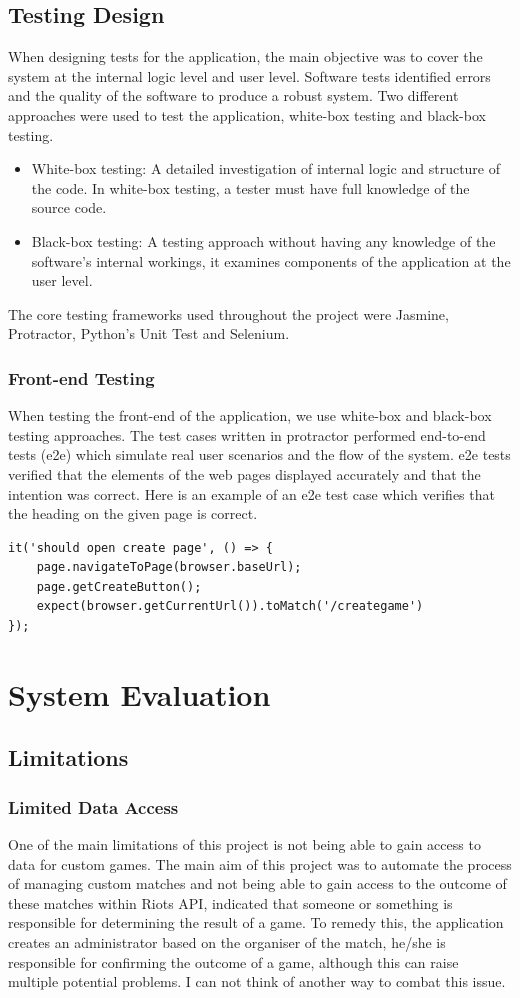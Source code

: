 \section{Testing Design}
When designing tests for the application, the main objective was to cover the system at the internal logic level and user level. Software tests identified errors and the quality of the software \cite{nidhra2012black} to produce a robust system. Two different approaches were used to test the application, white-box testing and black-box testing. 
\begin{itemize}
	\item White-box testing: A detailed investigation of internal logic and structure of the code. In white-box testing, a tester must have full knowledge of the source code.
	\item Black-box testing: A testing approach without having any knowledge of the software's internal workings, it examines components of the application at the user level.
\end{itemize}

The core testing frameworks used throughout the project were Jasmine, Protractor, Python's Unit Test and Selenium. 
\subsection{Front-end Testing}
When testing the front-end of the application, we use white-box and black-box testing approaches. The test cases written in protractor performed end-to-end tests (e2e) which simulate real user scenarios and the flow of the system. e2e tests verified that the elements of the web pages displayed accurately and that the intention was correct.
Here is an example of an e2e test case which verifies that the heading on the given page is correct.
\begin{verbatim}
it('should open create page', () => {
	page.navigateToPage(browser.baseUrl);
	page.getCreateButton();
	expect(browser.getCurrentUrl()).toMatch('/creategame')
});
\end{verbatim} 

\chapter{System Evaluation}
\section{Limitations}
\subsection{Limited Data Access}
One of the main limitations of this project is not being able to gain access to data for custom games. The main aim of this project was to automate the process of managing custom matches and not being able to gain access to the outcome of these matches within Riots API, indicated that someone or something is responsible for determining the result of a game. To remedy this, the application creates an administrator based on the organiser of the match, he/she is responsible for confirming the outcome of a game, although this can raise multiple potential problems. I can not think of another way to combat this issue.
